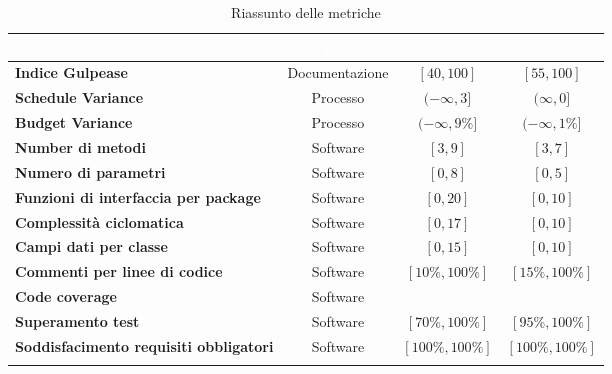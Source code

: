	\renewcommand{\arraystretch}{1.5}
	\begin{longtable}{C{4cm} c c c}
	
	\textcolor{white}{\textbf{Nome}} &
	\textcolor{white}{\textbf{Tipo}} &
	\textcolor{white}{\textbf{Accettabile}} &
	\textcolor{white}{\textbf{Ottimale}}\\
	\endhead

	\textbf{Indice Gulpease} &
	Documentazione&
	$[40 , 100] $&
	$[55 , 100]$\\

	\textbf{Schedule Variance} &
	Processo&
	$(-\infty , 3] $&
	$(\infty , 0]$\\
	
	\textbf{Budget Variance} &
	Processo&
	$(-\infty , 9\%] $&
	$(-\infty , 1\%]$\\


	\textbf{Number di metodi} &
	Software&
	$[3 , 9] $&
	$[3 , 7]$\\
	
	\textbf{Numero di parametri} &
	Software&
	$[0 , 8] $&
	$[0 , 5]$\\
	
	\textbf{Funzioni di interfaccia per package} &
	Software&
	$[0 , 20] $&
	$[0 , 10]$\\
	
	\textbf{Complessità ciclomatica} &
	Software&
	$[0 , 17] $&
	$[0 , 10]$\\
	
	\textbf{Campi dati per classe} &
	Software&
	$[0 , 15] $&
	$[0 , 10]$\\
	
	\textbf{Commenti per linee di codice} &
	Software&
	$[10\%, 100\%] $&
	$[15\% , 100\%]$\\
	
	\textbf{Code coverage} &
	Software&
	&
	\\
	
	\textbf{Superamento test} &
	Software&
	$[70\%, 100\%]$&
	$[95\%, 100\%]$\\
	
	\textbf{Soddisfacimento requisiti obbligatori} &
	Software&
	$[100\%, 100\%]$&
	$[100\%, 100\%]$\\
	
	\caption{Riassunto delle metriche}\\	
	\end{longtable}